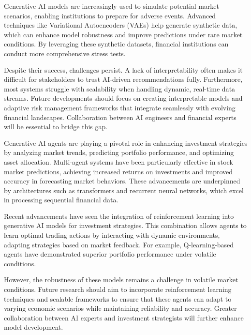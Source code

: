 \documentclass[a4paper,12pt]{scrbook}
\begin{document}
	Generative AI models are increasingly used to simulate potential market scenarios, enabling institutions to prepare for adverse events. Advanced techniques like Variational Autoencoders (VAEs) help generate synthetic data, which can enhance model robustness and improve predictions under rare market conditions. By leveraging these synthetic datasets, financial institutions can conduct more comprehensive stress tests.
	
	Despite their success, challenges persist. A lack of interpretability often makes it difficult for stakeholders to trust AI-driven recommendations fully. Furthermore, most systems struggle with scalability when handling dynamic, real-time data streams. Future developments should focus on creating interpretable models and adaptive risk management frameworks that integrate seamlessly with evolving financial landscapes. Collaboration between AI engineers and financial experts will be essential to bridge this gap.
	
	
	Generative AI agents are playing a pivotal role in enhancing investment strategies by analyzing market trends, predicting portfolio performance, and optimizing asset allocation. Multi-agent systems have been particularly effective in stock market predictions, achieving increased returns on investments and improved accuracy in forecasting market behaviors. These advancements are underpinned by architectures such as transformers and recurrent neural networks, which excel in processing sequential financial data.
	
	Recent advancements have seen the integration of reinforcement learning into generative AI models for investment strategies. This combination allows agents to learn optimal trading actions by interacting with dynamic environments, adapting strategies based on market feedback. For example, Q-learning-based agents have demonstrated superior portfolio performance under volatile conditions.
	
	However, the robustness of these models remains a challenge in volatile market conditions. Future research should aim to incorporate reinforcement learning techniques and scalable frameworks to ensure that these agents can adapt to varying economic scenarios while maintaining reliability and accuracy. Greater collaboration between AI experts and investment strategists will further enhance model development.
	
	
\end{document}
